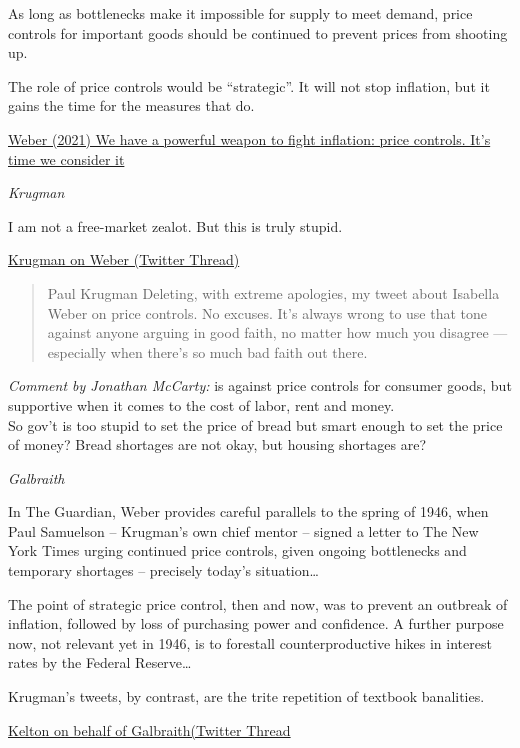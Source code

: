 \documentclass[
]{book}
\begin{document}
As long as bottlenecks make it impossible for supply to meet demand, price controls for important goods should be continued to prevent prices from shooting up.

The role of price controls would be ``strategic''.
It will not stop inflation, but it gains the time for the measures that do.

\href{https://www.theguardian.com/business/commentisfree/2021/dec/29/inflation-price-controls-time-we-use-it}{Weber (2021) We have a powerful weapon to fight inflation: price controls. It's time we consider it}

\emph{Krugman}

I am not a free-market zealot. But this is truly stupid.

\href{https://twitter.com/paulkrugman/status/1476551183414312971}{Krugman on Weber (Twitter Thread)}

\begin{quote}
Paul Krugman \citet{paulkrugman}
Deleting, with extreme apologies, my tweet about Isabella Weber on price controls. No excuses. It's always wrong to use that tone against anyone arguing in good faith, no matter how much you disagree --- especially when there's so much bad faith out there.
\end{quote}

\emph{Comment by Jonathan McCarty:}
\citet{paulkrugman}
is against price controls for consumer goods, but supportive when it comes to the cost of labor, rent and money.\\
So gov't is too stupid to set the price of bread but smart enough to set the price of money? Bread shortages are not okay, but housing shortages are?

\emph{Galbraith}

In The Guardian, Weber provides careful parallels to the spring of 1946, when Paul Samuelson -- Krugman's own chief mentor -- signed a letter to The New York Times urging continued price controls, given ongoing bottlenecks and temporary shortages -- precisely today's situation\ldots{}

The point of strategic price control, then and now, was to prevent an outbreak of inflation, followed by loss of purchasing power and confidence. A further purpose now, not relevant yet in 1946, is to forestall counterproductive hikes in interest rates by the Federal Reserve\ldots{}

Krugman's tweets, by contrast, are the trite repetition of textbook banalities.

\href{https://twitter.com/StephanieKelton/status/1476938880045797378}{Kelton on behalf of Galbraith(Twitter Thread}
\end{document}
